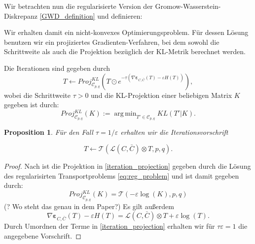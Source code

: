 \documentclass[11pt,a4paper]{article}
\DeclareMathOperator*{\argmin}{arg\,min}
\newtheorem{proposition}[theorem]{Proposition}
\numberwithin{equation}{section}
\begin{document}
	
Wir betrachten nun die regularisierte Version der Gromow-Wasserstein-Diskrepanz \ref{GWD_definition} und definieren:
	
	

	
	Wir erhalten damit ein nicht-konvexes Optimierungsproblem. Für dessen Lösung benutzen wir ein projiziertes Gradienten-Verfahren, bei dem sowohl die Schrittweite als auch die Projektion bezüglich der KL-Metrik berechnet werden.
	
	Die Iterationen sind gegeben durch
	\begin{equation}
	T \leftarrow Proj_{\mathcal{C}_{p,q}}^{KL} \left(T \odot e^{-\tau( \nabla \boldsymbol{\varepsilon}_{C, \bar{C}}(T) -\varepsilon H(T))} \right), \label{iteration_projection}
	\end{equation}
	wobei die Schrittweite $\tau > 0$ und die KL-Projektion einer beliebigen Matrix $K$ gegeben ist durch:
	\begin{equation}
	Proj_{\mathcal{C}_{p,q}}^{KL}(K) := \argmin_{T' \in \mathcal{C}_{p,q}} KL(T'|K).
	\end{equation}
	
	\begin{proposition} \label{prop:iteration_GW_eps}
		Für den Fall $\tau= 1/\varepsilon$ erhalten wir die Iterationsvorschrift
		
		\begin{equation}
		T \leftarrow \mathcal{T}(\mathcal{L} (C, \bar{C}) \otimes T,p,q). \label{simple_iteration}
		\end{equation}
	\end{proposition}
	\begin{proof}
		Nach \cite{iterative_bregman_projections} ist die Projektion in \ref{iteration_projection} gegeben durch die Lösung des regularisirten Transportproblems \ref{eq:reg_problem} und ist damit gegeben durch:
		\begin{equation}
		Proj_{\mathcal{C}_{p,q}}^{KL}(K) = \mathcal{T}(-\varepsilon \log (K), p, q)
		\end{equation}
		(? Wo steht das genau in dem Paper?)
		Es gilt außerdem
		\begin{equation}
		\nabla \boldsymbol{\varepsilon}_{C, \bar{C}}(T) -\varepsilon H(T) = \mathcal{L}(C,\bar{C}) \otimes T + \varepsilon\log (T).
		\end{equation}
		Durch Umordnen der Terme in \autoref{iteration_projection} erhalten wir für $\tau \varepsilon = 1$ die angegebene Vorschrift.
	\end{proof}
	
\end{document}
